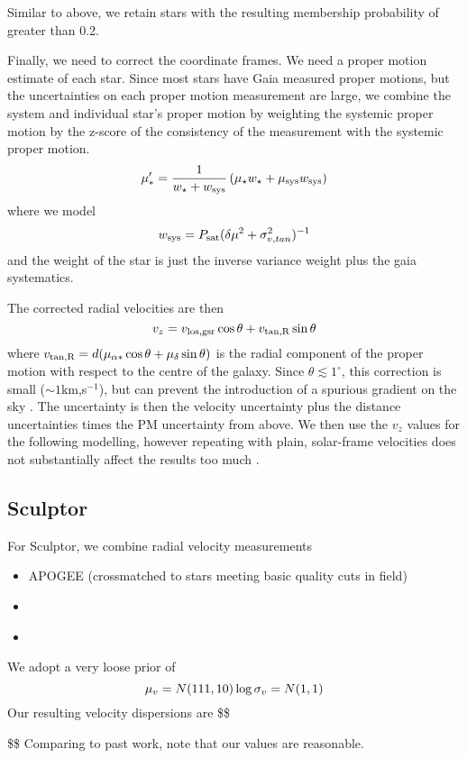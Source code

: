 Similar to above, we retain stars with the resulting membership
probability of greater than 0.2.

Finally, we need to correct the coordinate frames. We need a proper
motion estimate of each star. Since most stars have Gaia measured proper
motions, but the uncertainties on each proper motion measurement are
large, we combine the system and individual star's proper motion by
weighting the systemic proper motion by the z-score of the consistency
of the measurement with the systemic proper motion. \[
\mu_{*}' = \frac{1}{w_\star + w_{\rm sys}}\left(\mu_{\star}w_\star + \mu_{\rm sys} w_{\rm sys}\right)
\] where we model \[
{w_{\rm sys}} = P_{\rm sat}(\delta \mu ^2 + \sigma_{v, tan}^2)^{-1}
\] and the weight of the star is just the inverse variance weight plus
the gaia systematics.

The corrected radial velocities are then \[
v_z = v_{\rm los, gsr}\cos\theta  + v_{\rm tan, R} \sin\theta
\] where
\(v_{\rm tan, R} = d(\mu_{\alpha*}\cos\theta + \mu_\delta \sin \theta)\)
is the radial component of the proper motion with respect to the centre
of the galaxy. Since \(\theta \lesssim 1^\circ\), this correction is
small (\(\sim 1\)km,s\(^{-1}\)), but can prevent the introduction of a
spurious gradient on the sky \citep{WMO2008}. The uncertainty is then
the velocity uncertainty plus the distance uncertainties times the PM
uncertainty from above. We then use the \(v_z\) values for the following
modelling, however repeating with plain, solar-frame velocities does not
substantially affect the results too much .

\subsection{Sculptor}\label{sculptor}

For Sculptor, we combine radial velocity measurements

\begin{itemize}
\item
  APOGEE (crossmatched to stars meeting basic quality cuts in field)
\item
  \citet{sestito+2024a}
\item
  \citet{tolstoy+2024}
\end{itemize}

We adopt a very loose prior of \[
\mu_{v} = N(111, 10) \\
\log\sigma_{v} = N(1, 1)
\] Our resulting velocity dispersions are \$\$

\$\$ Comparing to past work, note that our values are reasonable.

